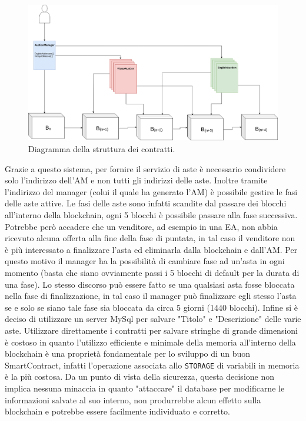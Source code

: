 \begin{figure}[h]
	\centering
	\includegraphics[scale=0.3]{contratti.png}
	\caption{Diagramma della struttura dei contratti.}\label{fig1.1}
\end{figure}
Grazie a questo sistema, per fornire il servizio di aste è necessario condividere solo l'indirizzo dell'AM e non tutti gli indirizzi delle aste. Inoltre tramite l'indirizzo del manager (colui il quale ha generato l'AM) è possibile gestire le fasi delle aste attive. Le fasi delle aste sono infatti scandite dal passare dei blocchi all'interno della blockchain, ogni 5 blocchi è possibile passare alla fase successiva. Potrebbe però accadere che un venditore, ad esempio in una EA, non abbia ricevuto alcuna offerta alla fine della fase di puntata, in tal caso il venditore non è più interessato a finalizzare l'asta ed eliminarla dalla blockchain e dall'AM. Per questo motivo il manager ha la possibilità di cambiare fase ad un'asta in ogni momento (basta che siano ovviamente passi i 5 blocchi di default per la durata di una fase).  Lo stesso discorso può essere fatto se una qualsiasi asta fosse bloccata nella fase di finalizzazione, in tal caso il manager può finalizzare egli stesso l'asta se e solo se siano tale fase sia bloccata da circa 5 giorni (1440 blocchi).\newline
Infine si è deciso di utilizzare un server MySql per salvare "Titolo" e "Descrizione" delle varie aste. Utilizzare direttamente i contratti per salvare stringhe di grande dimensioni è costoso in quanto l'utilizzo efficiente e minimale della memoria all'interno della blockchain è una proprietà fondamentale per lo sviluppo di un buon SmartContract, infatti l'operazione associata allo \texttt{STORAGE} di variabili in memoria è la più costosa. Da un punto di vista della sicurezza, questa decisione non implica nessuna minaccia in quanto "attaccare" il database per modificarne le informazioni salvate al suo interno, non produrrebbe alcun effetto sulla blockchain e potrebbe essere facilmente individuato e corretto.
